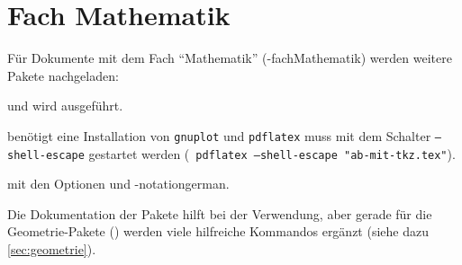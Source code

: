 \section{Fach Mathematik}\label{sec:fachmathe}

Für Dokumente mit dem Fach \enquote{Mathematik} (\keyis*-{fach}{Mathematik}) werden weitere Pakete nachgeladen:
\begin{multicols}{2}
	\begin{smallitemize}
		\item {}
		\item {}
		\item {}
		\item {}
		\item {}
		\item {}
		\item {} und  wird ausgeführt.
		\item {} benötigt eine Installation von \texttt{gnuplot} und \texttt{pdflatex} muss mit dem Schalter \texttt{--shell-escape} gestartet werden (\zB\  \texttt{pdflatex --shell-escape "ab-mit-tkz.tex"}).
		\item {} mit den Optionen  und \keyis*-{notation}{german}.
		\item {}
		\item {}
	\end{smallitemize}
\end{multicols}

Die Dokumentation der Pakete hilft bei der Verwendung, aber gerade für die Geometrie-Pakete () werden viele hilfreiche Kommandos ergänzt (siehe dazu \ref{sec:geometrie}).

